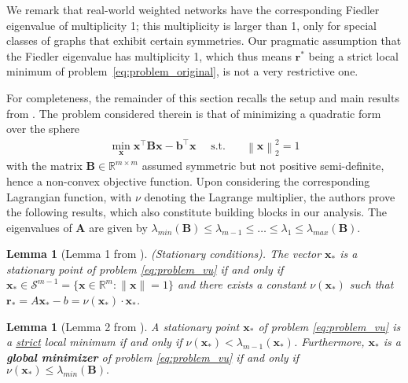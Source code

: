 \documentclass[nohyperref]{article}
\theoremstyle{plain}
\newtheorem{lemma}[theorem]{Lemma}
\theoremstyle{definition}
\theoremstyle{remark}
\begin{document}
We remark that real-world weighted networks have the corresponding Fiedler eigenvalue of multiplicity 1; this multiplicity is larger than 1, only for 
special classes of graphs that exhibit certain symmetries. Our pragmatic assumption that the Fiedler eigenvalue has multiplicity 1, which thus means $\mathbf{r}^*$ being a strict local minimum of problem~\ref{eq:problem_original}, is not a very restrictive one.


For completeness, the remainder of this section recalls the setup and main results from \cite{vu2019convergence}. The problem considered therein is that of minimizing a quadratic form over the sphere
\begin{align}
\label{eq:problem_vu}
\min_{\mathbf{x}} \mathbf{x}^\top  \mathbf{Bx}- \mathbf{b}^\top\mathbf{x}
\quad  \text{ s.t.} & \quad \left\lVert \mathbf{x} \right\rVert_2^2 = 1
\end{align} 
\noindent with the matrix $\mathbf{B}\in\mathbb{R}^{m\times m}$ assumed symmetric but not positive semi-definite, hence a non-convex objective function. Upon considering the corresponding Lagrangian function, with $\nu$ denoting the Lagrange multiplier, the authors prove the following results, which also constitute building blocks in our analysis. The eigenvalues of $\mathbf{A}$ are given by $ \lambda_{min}(\mathbf{B}) \leq \lambda_{m-1} \leq \ldots \leq \lambda_1 \leq \lambda_{max}(\mathbf{B})$. 


\begin{lemma}[Lemma 1 from \cite{vu2019convergence}]
\label{lem:vuLemma1}
(Stationary conditions). The vector $\mathbf{x}_{*}$  is a stationary point of problem \eqref{eq:problem_vu} if and only if $\mathbf{x}_{*} \in \mathcal{S}^{m-1}=\{\mathbf{x}\in\mathbb{R}^m:\lVert \mathbf{x}\rVert=1\} $ and there exists a constant 
$ \nu(\mathbf{x}_{*}) $
such that $\mathbf{r}_{*} = A \mathbf{x}_{*} - b = \nu(\mathbf{x}_{*}) \cdot   \mathbf{x}_{*} $.
\end{lemma}




\begin{lemma}[Lemma 2 from \cite{vu2019convergence}]
\label{lem:vuLemma2}
A stationary point $\mathbf{x}_{*}$ of problem \eqref{eq:problem_vu} is a \underline{strict} local minimum if and only if 
$ \nu(\mathbf{x}_{*})  < \lambda_{m-1}(\mathbf{x}_{*})$. Furthermore, $\mathbf{x}_{*}$  is a \textbf{global minimizer} of problem \eqref{eq:problem_vu} if and only if 
$ \nu(\mathbf{x}_{*}) \leq \lambda_{min}(\mathbf{B}). $ 
\end{lemma}
\end{document}
